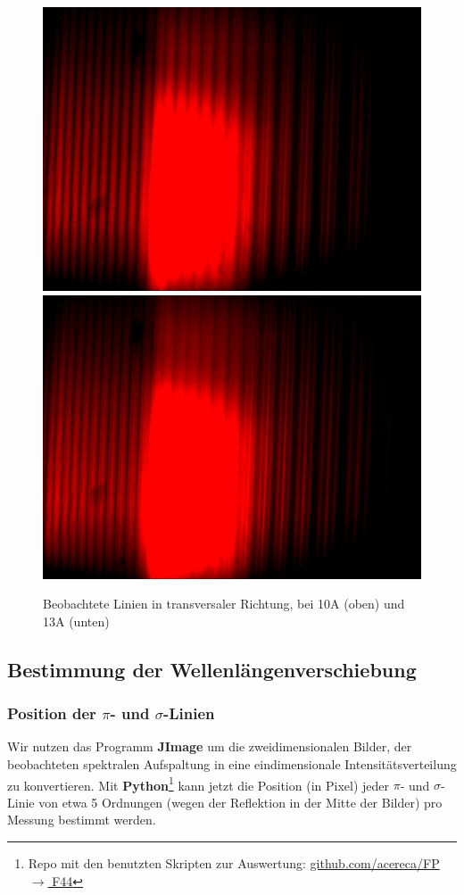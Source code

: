       \begin{figure}[H]
        \centering
        \includegraphics[width=.6\paperwidth,trim={0 600pt 0 500pt}, clip]{Auswertung/data/trans/10A/10A_l}
        \includegraphics[width=.6\paperwidth,trim={0 200pt 0 900pt}, clip]{Auswertung/data/trans/13A/13A_l}
        \caption{Beobachtete Linien in transversaler Richtung, bei 10A (oben) und 13A (unten)}
        \label{pic::4}
      \end{figure}

    \subsection{Bestimmung der Wellenlängenverschiebung}
      \subsubsection{Position der $\pi$- und $\sigma$-Linien}
        Wir nutzen das Programm \textbf{JImage} um die zweidimensionalen Bilder, der beobachteten spektralen Aufspaltung in eine eindimensionale Intensitätsverteilung zu konvertieren. Mit \textbf{Python}\footnote{Repo mit den benutzten Skripten zur Auswertung:  \href{github.com/acereca/FP/tree/master/F44 - Zeemanspektroskopie}{github.com/acereca/FP $\rightarrow$ F44}} kann jetzt die Position (in Pixel) jeder $\pi$- und $\sigma$-Linie von etwa 5 Ordnungen (wegen der Reflektion in der Mitte der Bilder) pro Messung bestimmt werden.

